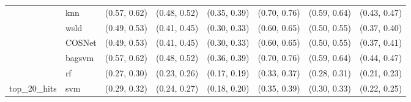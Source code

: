 \begin{table}[H]
{\begin{tabular}{llllllll}
 & knn & (0.57, 0.62) & (0.48, 0.52) & (0.35, 0.39) & (0.70, 0.76) & (0.59, 0.64) & (0.43, 0.47)\\

 & wsld & (0.49, 0.53) & (0.41, 0.45) & (0.30, 0.33) & (0.60, 0.65) & (0.50, 0.55) & (0.37, 0.40)\\

 & COSNet & (0.49, 0.53) & (0.41, 0.45) & (0.30, 0.33) & (0.60, 0.65) & (0.50, 0.55) & (0.37, 0.41)\\

 & bagsvm & (0.57, 0.62) & (0.48, 0.52) & (0.36, 0.39) & (0.70, 0.76) & (0.59, 0.64) & (0.44, 0.47)\\

 & rf & (0.27, 0.30) & (0.23, 0.26) & (0.17, 0.19) & (0.33, 0.37) & (0.28, 0.31) & (0.21, 0.23)\\

\multirow{-15}{*}{\raggedright\arraybackslash top\_20\_hits} & svm & (0.29, 0.32) & (0.24, 0.27) & (0.18, 0.20) & (0.35, 0.39) & (0.30, 0.33) & (0.22, 0.25)\\
\bottomrule
\end{tabular}}
\end{table}
